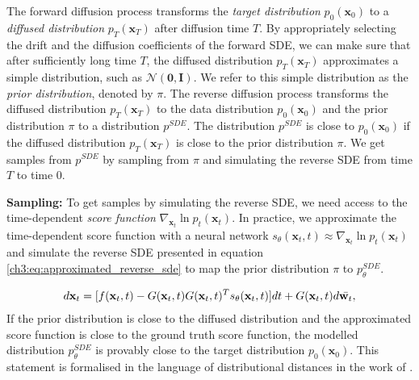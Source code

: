 The forward diffusion process transforms the \textit{target distribution} $p_0(\textbf{x}_0)$ to a \textit{diffused distribution} $p_T(\textbf{x}_T)$ after diffusion time $T$. By appropriately selecting the drift and the diffusion coefficients of the forward SDE, we can make sure that after sufficiently long time $T$, the diffused distribution $p_T(\textbf{x}_T)$ approximates a simple distribution, such as $\mathcal{N}(\textbf{0},\textbf{I})$. We refer to this simple distribution as the \textit{prior distribution}, denoted by $\pi$. The reverse diffusion process transforms the diffused distribution $p_T(\textbf{x}_T)$ to the data distribution $p_0(\textbf{x}_0)$ and the prior distribution $\pi$ to a distribution $p^{SDE}$. The distribution $p^{SDE}$ is close to $p_0(\textbf{x}_0)$ if the diffused distribution $p_T(\textbf{x}_T)$ is close to the prior distribution $\pi$. We get samples from $p^{SDE}$ by sampling from $\pi$ and simulating the reverse SDE from time $T$ to time $0$.

\textbf{Sampling:} To get samples by simulating the reverse SDE, we need access to the time-dependent \textit{score function} $\nabla_{\textbf{x}_t}{\ln{p_t(\textbf{x}_t)}}$. In practice, we approximate the time-dependent score function with a neural network $s_{\theta}(\textbf{x}_t,t) \approx \nabla_{\textbf{x}_t}{\ln{p_t(\textbf{x}_t)}}$ and simulate the reverse SDE presented in equation \ref{ch3:eq:approximated_reverse_sde} to map the prior distribution $\pi$ to $p^{SDE}_{\theta}$.

\begin{gather}\label{ch3:eq:approximated_reverse_sde}
d\textbf{x}_t=[f(\textbf{x}_t,t)-G(\textbf{x}_t,t)G(\textbf{x}_t,t)^Ts_{\theta}(\textbf{x}_t,t)]dt + G(\textbf{x}_t,t)d\Bar{\textbf{w}_t},
\end{gather}If the prior distribution is close to the diffused distribution and the approximated score function is close to the ground truth score function, the modelled distribution  $p^{SDE}_{\theta}$ is provably close to the target distribution $p_0(\textbf{x}_0)$. This statement is formalised in the language of distributional distances in the work of \cite{song2021maximum}. 



